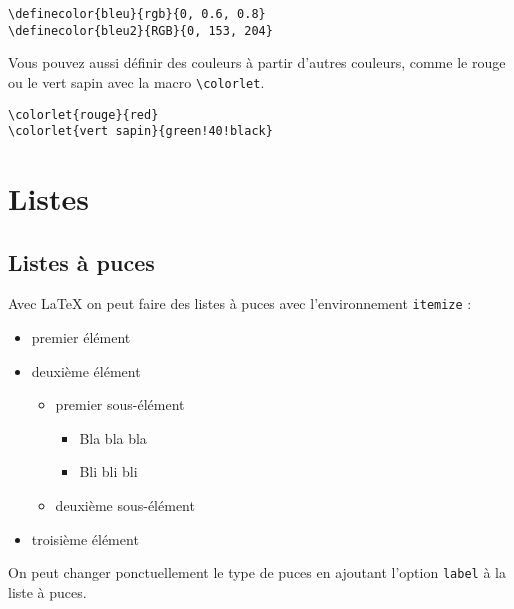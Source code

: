 \documentclass{rapport}
\def\Latex{\LaTeX\xspace}
\begin{document}
        \begin{verbatim}
\definecolor{bleu}{rgb}{0, 0.6, 0.8}
\definecolor{bleu2}{RGB}{0, 153, 204}\end{verbatim}
        

        Vous pouvez aussi définir des couleurs à partir d'autres couleurs, comme le \textcolor{rouge}{rouge} ou le \textcolor{vert sapin}{vert sapin} avec la macro \verb|\colorlet|.
        \begin{verbatim}
\colorlet{rouge}{red}
\colorlet{vert sapin}{green!40!black}\end{verbatim}
    
    
    \section{Listes}
      
      \subsection{Listes à puces}
        Avec \Latex on peut faire des listes à puces avec l'environnement \verb|itemize| :
        
        \begin{itemize}
          \item premier élément
          \item deuxième élément
          \begin{itemize}
            \item premier sous-élément
            \begin{itemize}
              \item Bla bla bla
              \item Bli bli bli
            \end{itemize}
            \item deuxième sous-élément
          \end{itemize}
          \item troisième élément
        \end{itemize}
        
        On peut changer ponctuellement le type de puces en ajoutant l'option \verb|label| à la liste à puces.
        
\end{document}
